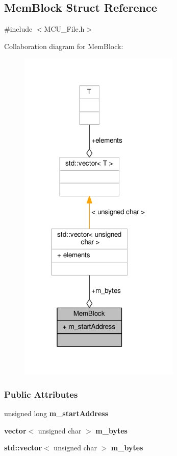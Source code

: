 \subsection{Mem\+Block Struct Reference}
\label{classMemBlock}


{\ttfamily \#include $<$M\+C\+U\+\_\+\+File.\+h$>$}



Collaboration diagram for Mem\+Block\+:
\nopagebreak
\begin{figure}[H]
\begin{center}
\leavevmode
\includegraphics[width=218pt]{d0/d27/classMemBlock__coll__graph}
\end{center}
\end{figure}
\subsubsection*{Public Attributes}
\begin{DoxyCompactItemize}
\item 
unsigned long {\bf m\+\_\+start\+Address}
\item 
{\bf vector}$<$ unsigned char $>$ {\bf m\+\_\+bytes}
\item 
{\bf std\+::vector}$<$ unsigned char $>$ {\bf m\+\_\+bytes}
\end{DoxyCompactItemize}


